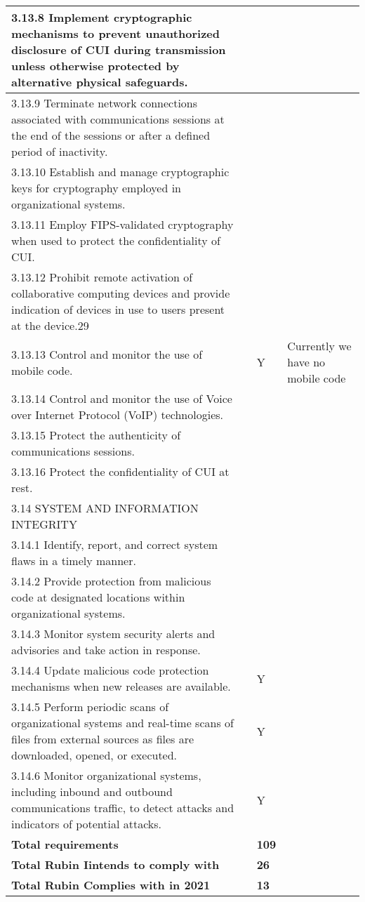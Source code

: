 \begin{longtable} {|p{}|p{}|p{}|p{} |}
{3.13.8 Implement cryptographic mechanisms to prevent unauthorized disclosure of CUI during transmission unless otherwise protected by alternative physical safeguards.}&&& \\ \hline
{3.13.9 Terminate network connections associated with communications sessions at the end of the sessions or after a defined period of inactivity.}&&& \\ \hline
{3.13.10 Establish and manage cryptographic keys for cryptography employed in organizational systems.}&&& \\ \hline
{3.13.11 Employ FIPS-validated cryptography when used to protect the confidentiality of CUI.}&&& \\ \hline
{3.13.12 Prohibit remote activation of collaborative computing devices and provide indication of devices in use to users present at the device.29}&&& \\ \hline
{3.13.13 Control and monitor the use of mobile code.}&{}&{Y}&{Currently we have no mobile code} \\ \hline
{3.13.14 Control and monitor the use of Voice over Internet Protocol (VoIP) technologies.}&&& \\ \hline
{3.13.15 Protect the authenticity of communications sessions.}&&& \\ \hline
{3.13.16 Protect the confidentiality of CUI at rest.}&&& \\ \hline
{3.14 SYSTEM AND INFORMATION INTEGRITY}&&& \\ \hline
{3.14.1 Identify, report, and correct system flaws in a timely manner.}&&& \\ \hline
{3.14.2 Provide protection from malicious code at designated locations within organizational systems.}&&& \\ \hline
{3.14.3 Monitor system security alerts and advisories and take action in response.}&&& \\ \hline
{3.14.4 Update malicious code protection mechanisms when new releases are available.}&{}&{Y}& \\ \hline
{3.14.5 Perform periodic scans of organizational systems and real-time scans of files from external sources as files are downloaded, opened, or executed.}&{}&{Y}& \\ \hline
{3.14.6 Monitor organizational systems, including inbound and outbound communications traffic, to detect attacks and indicators of potential attacks.}&{}&{Y}& \\ \hline
\textbf{Total requirements}&\textbf{}&\textbf{109}& \\ \hline
\textbf{Total Rubin Iintends to comply with }&\textbf{}&\textbf{26}& \\ \hline
\textbf{Total Rubin Complies with in 2021}&\textbf{}&\textbf{13}& \\ \hline
\end{longtable} \normalsize
